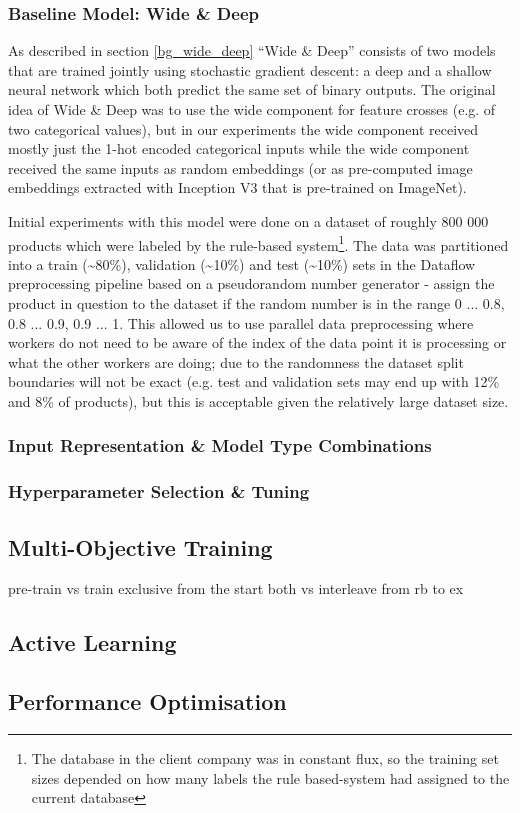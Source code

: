 \subsubsection{Baseline Model: Wide \& Deep}
\label{widedeep}

As described in section \ref{bg_wide_deep} ``Wide \& Deep'' consists of two models that are trained jointly using stochastic gradient descent: a deep and a shallow neural network which both predict the same set of binary outputs.
The original idea of Wide \& Deep was to use the wide component for feature crosses (e.g. of two categorical values), but in our experiments the wide component received mostly just the 1-hot encoded categorical inputs while the wide component received the same inputs as random embeddings (or as pre-computed image embeddings extracted with Inception V3 that is pre-trained on ImageNet).

Initial experiments with this model were done on a dataset of roughly 800 000 products which were labeled by the rule-based system\footnote{The database in the client company was in constant flux, so the training set sizes depended on how many labels the rule based-system had assigned to the current database}.
The data was partitioned into a train (\textasciitilde80\%), validation (\textasciitilde10\%) and test (\textasciitilde10\%) sets in the Dataflow preprocessing pipeline based on a pseudorandom number generator - assign the product in question to the dataset if the random number is in the range 0 ... 0.8, 0.8 ... 0.9, 0.9 ... 1.
This allowed us to use parallel data preprocessing where workers do not need to be aware of the index of the data point it is processing or what the other workers are doing; due to the randomness the dataset split boundaries will not be exact (e.g. test and validation sets may end up with 12\% and 8\% of products), but this is acceptable given the relatively large dataset size.

\subsubsection{Input Representation \& Model Type Combinations}
\label{model_comb}

\subsubsection{Hyperparameter Selection \& Tuning}
\label{tuning}

\subsection{Multi-Objective Training}
\label{multiobj}

pre-train vs train exclusive from the start
both vs interleave
from rb to ex

\subsection{Active Learning}
\label{exp_al}

\subsection{Performance Optimisation}
\label{performance}
